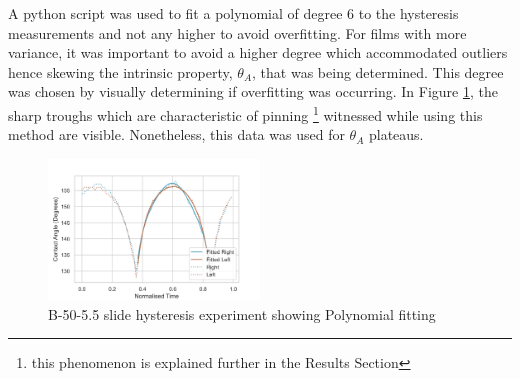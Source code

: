A python script was used to fit a polynomial of degree 6 to the hysteresis measurements and not any higher to avoid overfitting. For films with more variance, it was important to avoid a higher degree which accommodated outliers  hence skewing the intrinsic property, $\theta_A$, that was being determined. This degree was chosen by visually determining if overfitting was occurring. In Figure \ref{Hyster}, the sharp troughs which are characteristic of  pinning \footnote{this phenomenon is explained further in the Results Section} witnessed while using this method are visible. Nonetheless, this data was used for $\theta_A$ plateaus. 
\begin{figure}[h!]
\centering
  \includegraphics[width=0.5\textwidth]{Sections/Figures/B5055.png}
  \caption{B-50-5.5 slide hysteresis experiment showing Polynomial fitting}\label{Hyster}
\end{figure}
